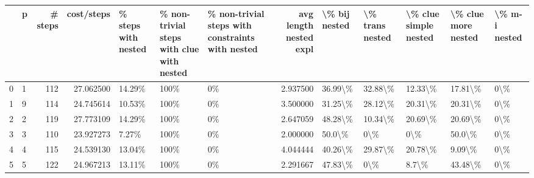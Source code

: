 \begin{tabular}{llrrlllrlllll}
\toprule
{} &  p &  \# steps &  cost/steps & \% steps with nested & \% non-trivial steps with clue with nested  & \% non-trivial steps with constraints with nested &  avg length nested expl & \textbackslash \% bij nested & \textbackslash \% trans nested & \textbackslash \% clue simple nested & \textbackslash \% clue more nested & \textbackslash \% m-i nested \\
\midrule
0 &  1 &      112 &   27.062500 &              14.29\% &                                       100\% &                                               0\% &                2.937500 &       36.99\textbackslash \% &         32.88\textbackslash \% &               12.33\textbackslash \% &             17.81\textbackslash \% &           0\textbackslash \% \\
1 &  9 &      114 &   24.745614 &              10.53\% &                                       100\% &                                               0\% &                3.500000 &       31.25\textbackslash \% &         28.12\textbackslash \% &               20.31\textbackslash \% &             20.31\textbackslash \% &           0\textbackslash \% \\
2 &  2 &      119 &   27.773109 &              14.29\% &                                       100\% &                                               0\% &                2.647059 &       48.28\textbackslash \% &         10.34\textbackslash \% &               20.69\textbackslash \% &             20.69\textbackslash \% &           0\textbackslash \% \\
3 &  3 &      110 &   23.927273 &               7.27\% &                                       100\% &                                               0\% &                2.000000 &        50.0\textbackslash \% &             0\textbackslash \% &                   0\textbackslash \% &              50.0\textbackslash \% &           0\textbackslash \% \\
4 &  4 &      115 &   24.539130 &              13.04\% &                                       100\% &                                               0\% &                4.044444 &       40.26\textbackslash \% &         29.87\textbackslash \% &               20.78\textbackslash \% &              9.09\textbackslash \% &           0\textbackslash \% \\
5 &  5 &      122 &   24.967213 &              13.11\% &                                       100\% &                                               0\% &                2.291667 &       47.83\textbackslash \% &             0\textbackslash \% &                 8.7\textbackslash \% &             43.48\textbackslash \% &           0\textbackslash \% \\

\end{tabular}
